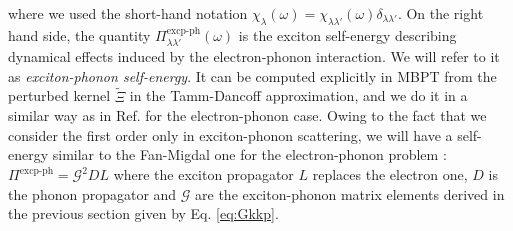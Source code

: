 where we used the short-hand notation $\chi_{\lambda}(\omega) = \chi_{\lambda\lambda'} (\omega) \delta_{\lambda\lambda'}$. On the right hand side, the quantity $\Pi^{\text{excp-ph}}_{\lambda\lambda'} (\omega)$ is the exciton self-energy describing dynamical effects induced by the electron-phonon interaction. We will refer to it as \textit{exciton-phonon self-energy}. It can be computed explicitly in \acrshort{MBPT}\cite{mahan2000many} from the perturbed kernel $\tilde{\Xi}$ in the Tamm-Dancoff approximation, and we do it in a similar way as in Ref. \cite{giustino2017review} for the electron-phonon case. Owing to the fact that we consider the first order only in exciton-phonon scattering, we will have a self-energy similar to the Fan-Migdal one for the electron-phonon problem : $\Pi^{\text{excp-ph}} = \mathcal{G}^2DL$ where the exciton propagator $L$ replaces the electron one, $D$ is the phonon propagator and $\mathcal{G}$ are the exciton-phonon matrix elements derived in the previous section given by Eq. \eqref{eq:Gkkp}. 

